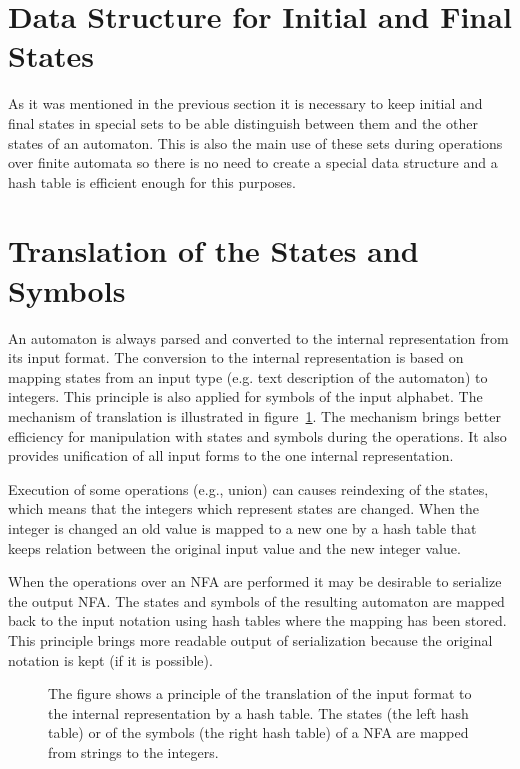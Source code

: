 \section{Data Structure for Initial and Final States}
As it was mentioned in the previous section it is necessary to keep initial and final states in special sets to 
be able distinguish between them and the other states of an automaton. This is also the main use of these sets during operations 
over finite automata so there is no need to create a special data structure and a hash table is efficient enough for this purposes. %

\section{Translation of the States and Symbols}
\label{sectionTranslate}
An automaton is always parsed and converted to the internal representation from its input format. 
The conversion to the internal representation is based on mapping states from an input type (e.g. text description of the automaton) 
to integers. This principle is also applied for symbols of the input alphabet. 
The mechanism of translation is illustrated in figure~\ref{figExplicitFATransl}. 
The mechanism brings better efficiency for manipulation with states and symbols
during the operations. It also provides unification of all input forms to the one internal representation. 

Execution of some operations (e.g., union) can causes reindexing of the states, which means that the integers 
which represent states are changed. When the integer is changed an old value is mapped to a new one by a hash table that keeps 
relation between the original input value and the new integer value.

When the operations over an NFA are performed it may be desirable to serialize the output NFA. The states and symbols of the resulting
automaton are mapped back to the input notation using hash tables where the mapping has been stored. This
principle brings more readable output of serialization because the original notation is kept (if it is possible).

\begin{figure}[bt]
\begin{center}

    \caption{The figure shows a principle of the translation of the input format to the internal representation by a hash table. 
      The states (the left hash table) or of the symbols (the right hash table) of a NFA are mapped from strings to the integers.}
		\label{figExplicitFATransl}
\end{center}
\end{figure}

